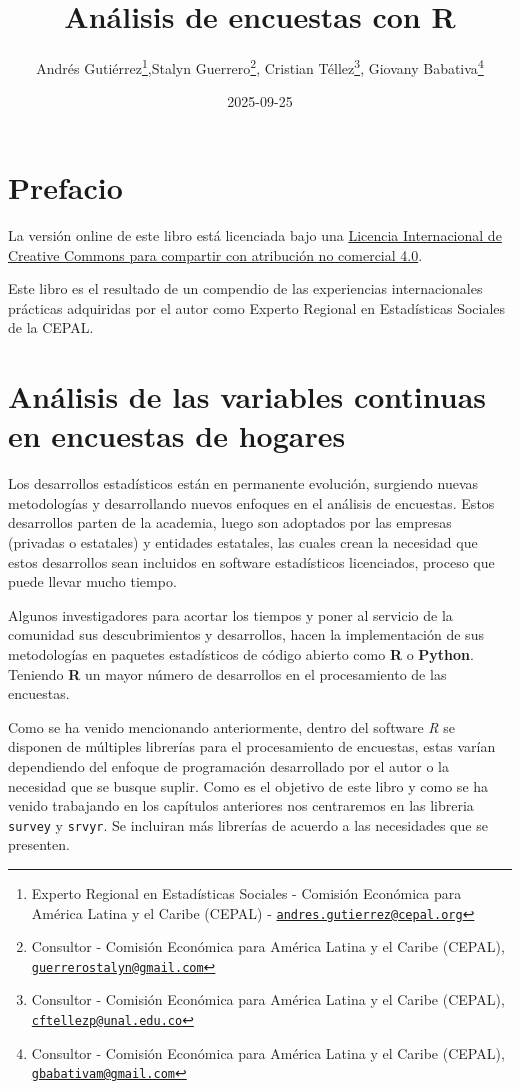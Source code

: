 \documentclass[
  12pt,
]{book}
\title{Análisis de encuestas con R}
\author{Andrés Gutiérrez\footnote{Experto Regional en Estadísticas Sociales - Comisión Económica para América Latina y el Caribe (CEPAL) - \href{mailto:andres.gutierrez@cepal.org}{\nolinkurl{andres.gutierrez@cepal.org}}},Stalyn Guerrero\footnote{Consultor - Comisión Económica para América Latina y el Caribe (CEPAL), \href{mailto:guerrerostalyn@gmail.com}{\nolinkurl{guerrerostalyn@gmail.com}}}, Cristian Téllez\footnote{Consultor - Comisión Económica para América Latina y el Caribe (CEPAL), \href{mailto:cftellezp@unal.edu.co}{\nolinkurl{cftellezp@unal.edu.co}}}, Giovany Babativa\footnote{Consultor - Comisión Económica para América Latina y el Caribe (CEPAL), \href{mailto:gbabativam@gmail.com}{\nolinkurl{gbabativam@gmail.com}}}}
\date{2025-09-25}
\begin{document}
\maketitle

{
\hypersetup{linkcolor=}
\setcounter{tocdepth}{1}
\tableofcontents
}
\listoffigures
\listoftables
\chapter*{Prefacio}\label{prefacio}

La versión online de este libro está licenciada bajo una \href{http://creativecommons.org/licenses/by-nc-sa/4.0/}{Licencia Internacional de Creative Commons para compartir con atribución no comercial 4.0}.

Este libro es el resultado de un compendio de las experiencias internacionales prácticas adquiridas por el autor como Experto Regional en Estadísticas Sociales de la CEPAL.

\chapter{Análisis de las variables continuas en encuestas de hogares}\label{anuxe1lisis-de-las-variables-continuas-en-encuestas-de-hogares}

Los desarrollos estadísticos están en permanente evolución, surgiendo nuevas metodologías y desarrollando nuevos enfoques en el análisis de encuestas. Estos desarrollos parten de la academia, luego son adoptados por las empresas (privadas o estatales) y entidades estatales, las cuales crean la necesidad que estos desarrollos sean incluidos en software estadísticos licenciados, proceso que puede llevar mucho tiempo.

Algunos investigadores para acortar los tiempos y poner al servicio de la comunidad sus descubrimientos y desarrollos, hacen la implementación de sus metodologías en paquetes estadísticos de código abierto como \textbf{R} o \textbf{Python}. Teniendo \textbf{R} un mayor número de desarrollos en el procesamiento de las encuestas.

Como se ha venido mencionando anteriormente, dentro del software \emph{R} se disponen de múltiples librerías para el procesamiento de encuestas, estas varían dependiendo del enfoque de programación desarrollado por el autor o la necesidad que se busque suplir. Como es el objetivo de este libro y como se ha venido trabajando en los capítulos anteriores nos centraremos en las libreria \texttt{survey} y \texttt{srvyr}. Se incluiran más librerías de acuerdo a las necesidades que se presenten.
\end{document}
